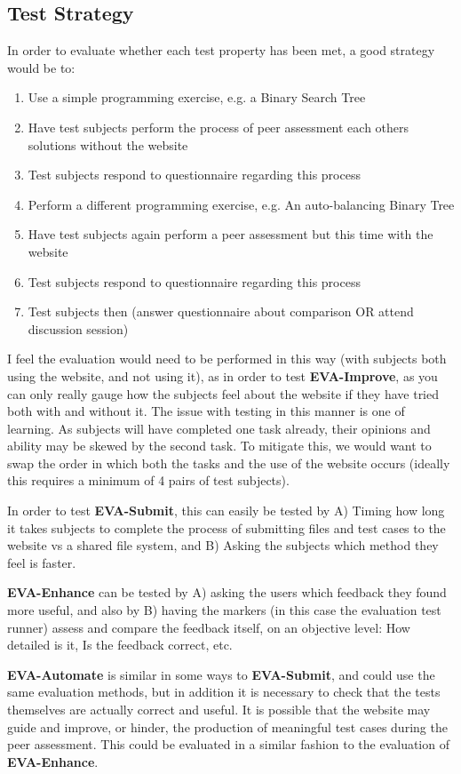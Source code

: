 \documentclass[a4paper,11pt]{report}
\begin{document}
\subsection{Test Strategy}
In order to evaluate whether each test property has been met, a good strategy would be to:
\begin{enumerate}
 \item Use a simple programming exercise, e.g. a Binary Search Tree
 \item Have test subjects perform the process of peer assessment each others solutions without the website
 \item Test subjects respond to questionnaire regarding this process
 \item Perform a different programming exercise, e.g. An auto-balancing Binary Tree
 \item Have test subjects again perform a peer assessment but this time with the website
 \item Test subjects respond to questionnaire regarding this process
 \item Test subjects then (answer questionnaire about comparison OR attend discussion session)
\end{enumerate}
I feel the evaluation would need to be performed in this way (with subjects both using the website, and not using it), as in order to test \textbf{EVA-Improve}, as you can only really gauge how the subjects feel about the website if they have tried both with and without it. The issue with testing in this manner is one of learning. As subjects will have completed one task already, their opinions and ability may be skewed by the second task. To mitigate this, we would want to swap the order in which both the tasks and the use of the website occurs (ideally this requires a minimum of 4 pairs of test subjects).\par
In order to test \textbf{EVA-Submit}, this can easily be tested by A) Timing how long it takes subjects to complete the process of submitting files and test cases to the website vs a shared file system, and B) Asking the subjects which method they feel is faster.\par
\textbf{EVA-Enhance} can be tested by A) asking the users which feedback they found more useful, and also by B) having the markers (in this case the evaluation test runner) assess and compare the feedback itself, on an objective level: How detailed is it, Is the feedback correct, etc.\par
\textbf{EVA-Automate} is similar in some ways to \textbf{EVA-Submit}, and could use the same evaluation methods, but in addition it is necessary to check that the tests themselves are actually correct and useful. It is possible that the website may guide and improve, or hinder, the production of meaningful test cases during the peer assessment. This could be evaluated in a similar fashion to the evaluation of \textbf{EVA-Enhance}.
\end{document}
